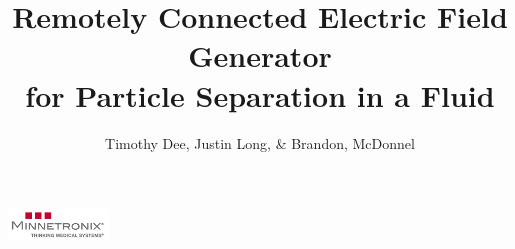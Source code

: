 \documentclass{tikzposter}
\author{Timothy Dee, Justin Long, \& Brandon, McDonnel}
\title{Remotely Connected Electric Field Generator \\
for Particle Separation in a Fluid}
\institute{Team May1612}
\begin{document}
\maketitle

{
\begin{tikzfigure}
\includegraphics[width=0.2\textwidth]{images/minnetronix_logo.png}
\end{tikzfigure} 
}

{
}

\block{}
{
}

\block{}
{
}

\block{}
{
}

\block{}
{
}

\block{}
{
}
\end{document}

